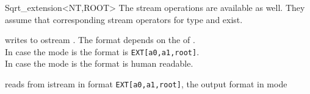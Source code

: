 \begin{ccRefClass}{Sqrt_extension<NT,ROOT>}
The stream operations are available as well. 
They assume that corresponding stream operators for type  and  exist.

{writes  to ostream . The format depends on the  of .\\
        In case the mode is  the format is {\tt EXT[a0,a1,root]}. \\
        In case the mode is  the format is human readable. \\
        }

{reads  from istream  in format {\tt EXT[a0,a1,root]}, the output format in mode  }



\end{ccRefClass}

